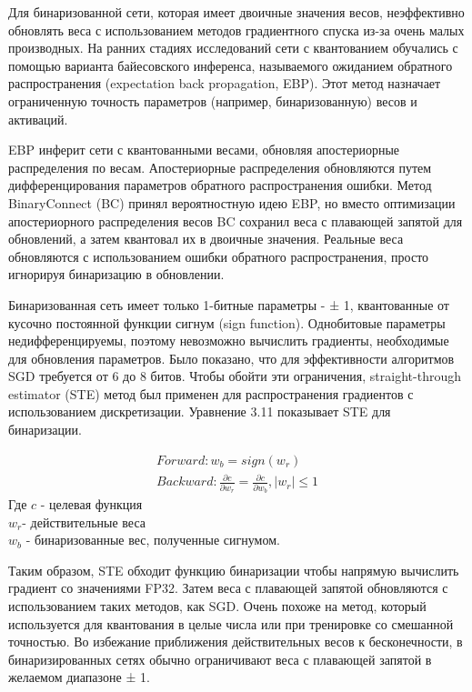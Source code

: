 \documentclass[oneside,final,12pt]{extreport}
\begin{document}
Для бинаризованной сети, которая имеет двоичные значения весов, неэффективно обновлять веса с использованием методов градиентного спуска из-за очень малых производных. На ранних стадиях исследований сети с квантованием обучались с помощью варианта байесовского инференса, называемого ожиданием обратного распространения (expectation back propagation, EBP). Этот метод назначает ограниченную точность параметров (например, бинаризованную) весов и активаций. 

EBP инферит сети с квантованными весами, обновляя апостериорные распределения по весам. Апостериорные распределения обновляются путем дифференцирования параметров обратного распространения ошибки. Метод BinaryConnect (BC) принял вероятностную идею EBP, но вместо оптимизации апостериорного распределения весов BC сохранил веса с плавающей запятой для обновлений, а затем квантовал их в двоичные значения. Реальные веса обновляются с использованием ошибки обратного распространения, просто игнорируя бинаризацию в обновлении. 

Бинаризованная сеть имеет только 1-битные параметры - ± 1, квантованные от кусочно постоянной функции сигнум (sign function). Однобитовые параметры недифференцируемы, поэтому невозможно вычислить градиенты, необходимые для обновления параметров. Было показано, что для эффективности алгоритмов SGD требуется от 6 до 8 битов. Чтобы обойти эти ограничения, straight-through estimator (STE) метод был применен для распространения градиентов с использованием дискретизации. Уравнение 3.11 показывает STE для бинаризации.

\begin{equation}
\begin{split}
    Forward: w_b = sign(w_r)\\
    Backward: \frac{\partial c}{\partial w_r}=\frac{\partial c}{\partial w_b}, \left | w_r \right | \leq1
\end{split}
\end{equation}
Где $c$ - целевая функция\\ 
$w_r$- действительные веса\\
$w_b$ - бинаризованные вес, полученные сигнумом.

Таким образом, STE обходит функцию бинаризации чтобы напрямую вычислить градиент со значениями FP32. Затем веса с плавающей запятой обновляются с использованием таких методов, как SGD. Очень похоже на метод, который используется для квантования в целые числа или при тренировке со смешанной точностью. Во избежание приближения действительных весов к бесконечности, в бинаризированных сетях обычно ограничивают веса с плавающей запятой в желаемом диапазоне ± 1.
\end{document}
